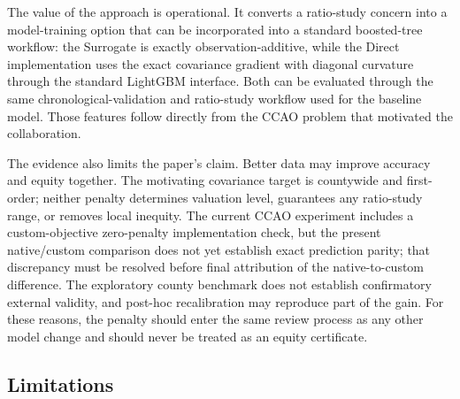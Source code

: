 \documentclass[10pt]{article}
\theoremstyle{definition}
\newcommand{\1}{\mathbf{1}}
\newcommand{\advisorchange}[1]{{\color{blue}#1}}
\newcommand{\oldtext}[1]{\textcolor{blue}{\sout{#1}}}
\newcommand{\newtext}[1]{\textcolor{impGreen}{#1}}
\begin{document}
\newtext{The value of the approach is operational. It converts a ratio-study concern into a model-training option that can be incorporated into a standard boosted-tree workflow: the Surrogate is exactly observation-additive, while the Direct implementation uses the exact covariance gradient with diagonal curvature through the standard LightGBM interface. Both can be evaluated through the same chronological-validation and ratio-study workflow used for the baseline model.} \advisorchange{Those features follow directly from the CCAO problem that motivated the collaboration.}

The evidence also limits the paper's claim. Better data may improve accuracy and equity together. 
\newtext{The motivating covariance target is countywide and first-order; neither penalty determines valuation level, guarantees any ratio-study range, or removes local inequity.} The current CCAO experiment includes a custom-objective zero-penalty implementation check, but the present native/custom comparison does not yet establish exact prediction parity; that discrepancy must be resolved before final attribution of the native-to-custom difference. The exploratory county benchmark does not establish confirmatory external validity, and post-hoc recalibration may reproduce part of the gain. For these reasons, the penalty should enter the same review process as any other model change and should never be treated as an equity certificate.

\subsection{Limitations}
\end{document}
